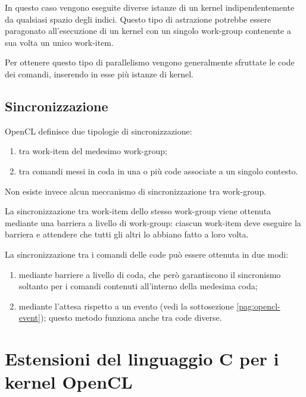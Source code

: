 \documentclass[12pt,a4paper,oneside]{book}
\begin{document}
In questo caso vengono eseguite diverse istanze di un kernel indipendentemente da qualsiasi spazio degli indici. Questo tipo di astrazione potrebbe essere paragonato all'esecuzione di un kernel con un singolo work-group contenente a sua volta un unico work-item.

Per ottenere questo tipo di parallelismo vengono generalmente sfruttate le code dei comandi, inserendo in esse più istanze di kernel.

\subsection{Sincronizzazione}

\ac{OpenCL} definisce due tipologie di sincronizzazione:
\begin{enumerate}
\item tra work-item del medesimo work-group;
\item tra comandi messi in coda in una o più code associate a un singolo contesto.
\end{enumerate}

Non esiste invece alcun meccanismo di sincronizzazione tra work-group.

La sincronizzazione tra work-item dello stesso work-group viene ottenuta mediante una barriera a livello di work-group: ciascun work-item deve eseguire la barriera e attendere che tutti gli altri lo abbiano fatto a loro volta.

La sincronizzazione tra i comandi delle code può essere ottenuta in due modi:
\begin{enumerate}
\item mediante barriere a livello di coda, che però garantiscono il sincronismo soltanto per i comandi contenuti all'interno della medesima coda;
\item mediante l'attesa rispetto a un evento (vedi la sottosezione \ref{pag:opencl-event}); questo metodo funziona anche tra code diverse.
\end{enumerate}

\section{Estensioni del linguaggio C per i kernel OpenCL}
\label{sec:opencl-c99}
\end{document}
